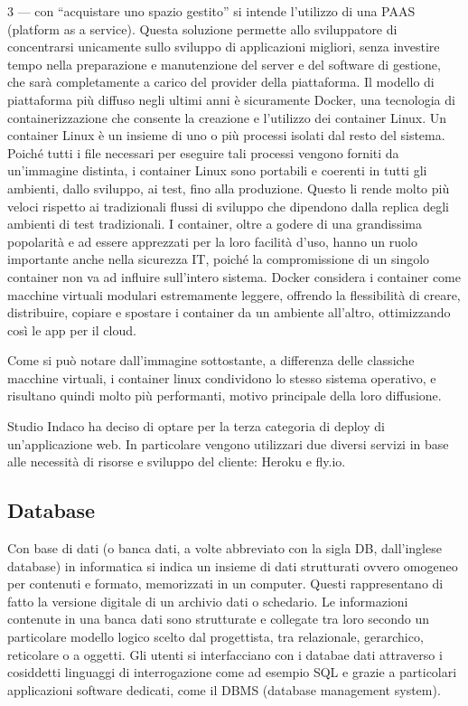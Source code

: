 \documentclass[12pt,a4paper]{article}
\begin{document}
3 –-- con “acquistare uno spazio gestito” si intende l’utilizzo di una PAAS (platform as a service). Questa soluzione permette allo sviluppatore di concentrarsi unicamente sullo sviluppo di applicazioni migliori, senza investire tempo nella preparazione e manutenzione del server e del software di gestione, che sarà completamente a carico del provider della piattaforma.
Il modello di piattaforma più diffuso negli ultimi anni è sicuramente Docker, una tecnologia di containerizzazione che consente la creazione e l'utilizzo dei container Linux.
Un container Linux è un insieme di uno o più processi isolati dal resto del sistema. Poiché tutti i file necessari per eseguire tali processi vengono forniti da un'immagine distinta, i container Linux sono portabili e coerenti in tutti gli ambienti, dallo sviluppo, ai test, fino alla produzione. Questo li rende molto più veloci rispetto ai tradizionali flussi di sviluppo che dipendono dalla replica degli ambienti di test tradizionali. I container, oltre a godere di una grandissima popolarità e ad essere apprezzati per la loro facilità d'uso, hanno un ruolo importante anche nella sicurezza IT, poiché la compromissione di un singolo container non va ad influire sull’intero sistema.
Docker considera i container come macchine virtuali modulari estremamente leggere, offrendo la flessibilità di creare, distribuire, copiare e spostare i container da un ambiente all'altro, ottimizzando così le app per il cloud.

Come si può notare dall’immagine sottostante, a differenza delle classiche macchine virtuali, i container linux condividono lo stesso sistema operativo, e risultano quindi molto più performanti, motivo principale della loro diffusione.

Studio Indaco ha deciso di optare per la terza categoria di deploy di un’applicazione web. In particolare vengono utilizzari due diversi servizi in base alle necessità di risorse e sviluppo del cliente: Heroku e fly.io.

\subsection{Database}
Con base di dati (o banca dati, a volte abbreviato con la sigla DB, dall'inglese database) in informatica si indica un insieme di dati strutturati ovvero omogeneo per contenuti e formato, memorizzati in un computer. Questi rappresentano di fatto la versione digitale di un archivio dati o schedario.
Le informazioni contenute in una banca dati sono strutturate e collegate tra loro secondo un particolare modello logico scelto dal progettista, tra relazionale, gerarchico, reticolare o a oggetti. Gli utenti si interfacciano con i databae dati attraverso i cosiddetti linguaggi di interrogazione come ad esempio SQL e grazie a particolari applicazioni software dedicati, come il DBMS (database management system).
\end{document}
